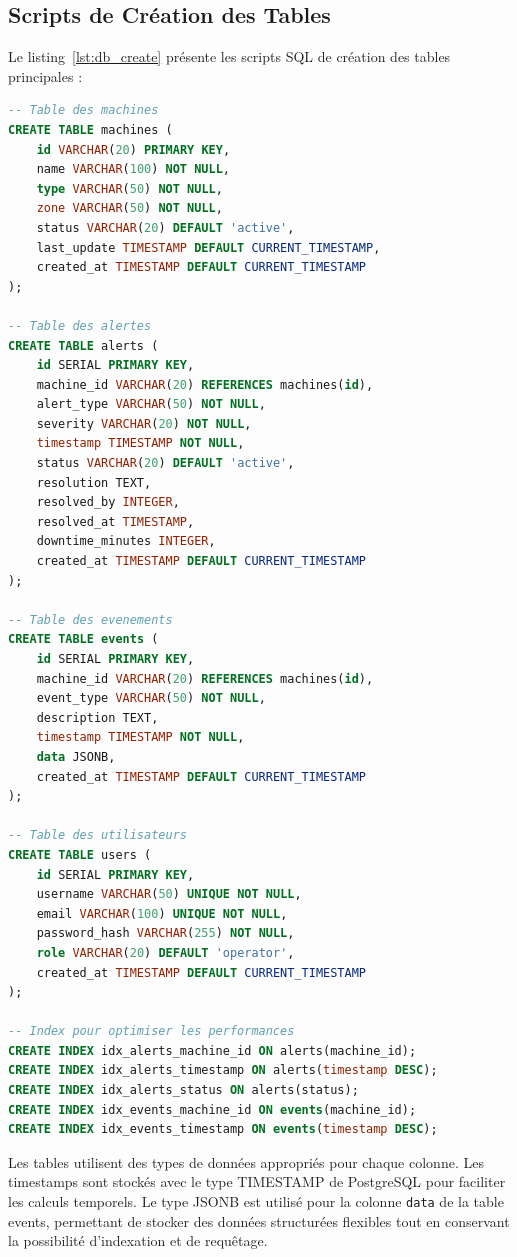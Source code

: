 \subsection{Scripts de Création des Tables}
\label{subsec:impl_db_tables}

Le listing~\ref{lst:db_create} présente les scripts SQL de création des tables principales :


\begin{lstlisting}[language=SQL, caption={Scripts de création des tables PostgreSQL}, label={lst:db_create}, captionpos=b]
-- Table des machines
CREATE TABLE machines (
    id VARCHAR(20) PRIMARY KEY,
    name VARCHAR(100) NOT NULL,
    type VARCHAR(50) NOT NULL,
    zone VARCHAR(50) NOT NULL,
    status VARCHAR(20) DEFAULT 'active',
    last_update TIMESTAMP DEFAULT CURRENT_TIMESTAMP,
    created_at TIMESTAMP DEFAULT CURRENT_TIMESTAMP
);

-- Table des alertes
CREATE TABLE alerts (
    id SERIAL PRIMARY KEY,
    machine_id VARCHAR(20) REFERENCES machines(id),
    alert_type VARCHAR(50) NOT NULL,
    severity VARCHAR(20) NOT NULL,
    timestamp TIMESTAMP NOT NULL,
    status VARCHAR(20) DEFAULT 'active',
    resolution TEXT,
    resolved_by INTEGER,
    resolved_at TIMESTAMP,
    downtime_minutes INTEGER,
    created_at TIMESTAMP DEFAULT CURRENT_TIMESTAMP
);

-- Table des evenements
CREATE TABLE events (
    id SERIAL PRIMARY KEY,
    machine_id VARCHAR(20) REFERENCES machines(id),
    event_type VARCHAR(50) NOT NULL,
    description TEXT,
    timestamp TIMESTAMP NOT NULL,
    data JSONB,
    created_at TIMESTAMP DEFAULT CURRENT_TIMESTAMP
);

-- Table des utilisateurs
CREATE TABLE users (
    id SERIAL PRIMARY KEY,
    username VARCHAR(50) UNIQUE NOT NULL,
    email VARCHAR(100) UNIQUE NOT NULL,
    password_hash VARCHAR(255) NOT NULL,
    role VARCHAR(20) DEFAULT 'operator',
    created_at TIMESTAMP DEFAULT CURRENT_TIMESTAMP
);

-- Index pour optimiser les performances
CREATE INDEX idx_alerts_machine_id ON alerts(machine_id);
CREATE INDEX idx_alerts_timestamp ON alerts(timestamp DESC);
CREATE INDEX idx_alerts_status ON alerts(status);
CREATE INDEX idx_events_machine_id ON events(machine_id);
CREATE INDEX idx_events_timestamp ON events(timestamp DESC);
\end{lstlisting}

Les tables utilisent des types de données appropriés pour chaque colonne. Les timestamps sont stockés avec le type TIMESTAMP de PostgreSQL pour faciliter les calculs temporels. Le type JSONB est utilisé pour la colonne \texttt{data} de la table events, permettant de stocker des données structurées flexibles tout en conservant la possibilité d'indexation et de requêtage.

